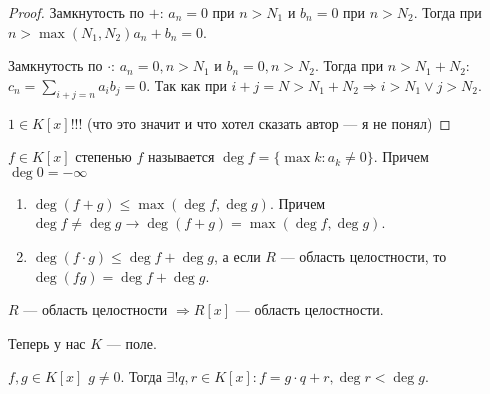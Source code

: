 \begin{proof}
    Замкнутость по $+$:  $a_n = 0$ при  $n > N_1$ и  $b_n = 0$ при $n > N_2$. Тогда при $n > \max(N_1, N_2) a_n+b_n = 0$.

    Замкнутость по $\cdot$:  $a_n = 0, n > N_1$ и $b_n = 0, n > N_2$. Тогда при  $n > N_1+N_2:$ $c_n = \sum_{i+j=n} a_ib_j = 0$. Так как при  $i + j = N > N_1+N_2 \Rightarrow i > N_1 \lor j > N_2$.

    $1 \in K[x]$!!! (что это значит и что хотел сказать автор --- я не понял)
\end{proof}
\begin{definition}
    $f \in K[x]$ степенью  $f$ называется  $\deg f = \{\max k: a_k \neq 0\}$. Причем $\deg 0 = -\infty$
\end{definition}
\begin{properties}
    \slashn
    \begin{enumerate}
        \item $\deg (f+g) \le \max(\deg f, \deg g)$. Причем $\deg f \neq \deg g \to \deg(f+g) = \max(\deg f, \deg g)$. 
        \item $\deg(f\cdot g) \le \deg f + \deg g$, а если $R$ --- область целостности, то  $\deg (fg) = \deg f + \deg g$.
    \end{enumerate}
\end{properties}
\begin{consequence}
    $R$ --- область целостности  $\Rightarrow R[x]$ --- область целостности.
\end{consequence}
\slashn
Теперь у нас $K$ --- поле.
\begin{theorem}
    $f, g \in K[x]$ $g \neq 0$. Тогда  $\exists! q, r \in K[x]: f = g\cdot q + r, \deg r < \deg g$.
\end{theorem}
